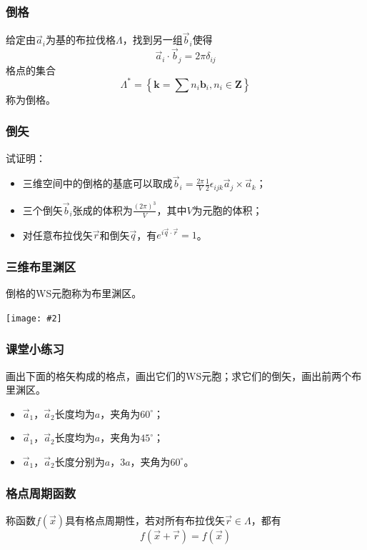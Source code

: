 \documentclass[CJK]{beamer}
\newcommand{\cpic}[2]{
\begin{center}
\texttt{[image: \#2]}
\end{center}
}
\begin{document}
\begin{frame}
\ech
\end{frame}

\begin{frame}
\frametitle{\bch 倒格 \ech}
\bch
给定由$\vec{a}_i$为基的布拉伐格$\Lambda$，找到另一组$\vec{b}_i$使得
$$
\vec{a}_i \cdot \vec{b}_j = 2\pi \delta_{ij}
$$
格点的集合
$$
\Lambda^{*}=\left\{\mathbf{k}=\sum n_{i} \mathbf{b}_{i}, n_{i} \in \mathbf{Z}\right\}
$$称为倒格。
\par

\ech
\end{frame}

\begin{frame}
\frametitle{\bch 倒矢 \ech}
\bch
试证明：
\begin{itemize}
\item 三维空间中的倒格的基底可以取成$\vec{b}_i = \frac{2\pi}{V} \frac{1}{2} \epsilon_{ijk} \vec{a}_j \times \vec{a}_k$；
\item 三个倒矢$\vec{b}_i$张成的体积为$\frac{(2\pi)^3}{V}$，其中$V$为元胞的体积；
\item 对任意布拉伐矢$\vec r$和倒矢$\vec q$，有$e^{i\vec q \cdot \vec r } =1$。
\end{itemize}
\ech
\end{frame}

\begin{frame}
\frametitle{\bch 三维布里渊区 \ech}
\bch
倒格的WS元胞称为布里渊区。
\cpic{0.4}{brillouin}
\ech
\end{frame}

\begin{frame}
\frametitle{\bch 课堂小练习 \ech}
\bch
画出下面的格矢构成的格点，画出它们的WS元胞；求它们的倒矢，画出前两个布里渊区。
\begin{itemize}
\item $\vec{a}_1$，$\vec{a}_2$长度均为$a$，夹角为$60^\circ$；
\item $\vec{a}_1$，$\vec{a}_2$长度均为$a$，夹角为$45^\circ$；
\item $\vec{a}_1$，$\vec{a}_2$长度分别为$a$，$3a$，夹角为$60^\circ$。
\end{itemize}
\ech
\end{frame}


\begin{frame}
\frametitle{\bch 格点周期函数 \ech}
\bch
称函数$f(\vec x)$具有格点周期性，若对所有布拉伐矢$\vec r \in \Lambda$，都有
$$
f(\vec x + \vec r) = f(\vec x)
$$

\ech
\end{frame}
\end{document}
